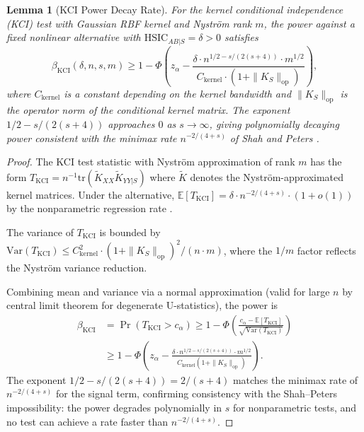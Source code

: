 \documentclass[11pt,a4paper]{article}
\newtheorem{lemma}[theorem]{Lemma}
\theoremstyle{definition}
\theoremstyle{remark}
\newcommand{\Phi}{\varPhi}
\newcommand{\E}{\mathbb{E}}
\begin{document}
\begin{lemma}[KCI Power Decay Rate]\label{lem:kci_power}
For the kernel conditional independence (KCI) test with Gaussian RBF kernel and
Nystr\"om rank $m$, the power against a fixed nonlinear alternative with
$\mathrm{HSIC}_{AB|S} = \delta > 0$ satisfies
\[
  \beta_{\mathrm{KCI}}(\delta, n, s, m) \geq 1 - \Phi\!\left(z_{\alpha}
  - \frac{\delta \cdot n^{1/2 - s/(2(s+4))} \cdot m^{1/2}}{C_{\mathrm{kernel}}
  \cdot (1 + \|K_S\|_{\mathrm{op}})}\right),
\]
where $C_{\mathrm{kernel}}$ is a constant depending on the kernel bandwidth and
$\|K_S\|_{\mathrm{op}}$ is the operator norm of the conditional kernel matrix.
The exponent $1/2 - s/(2(s+4))$ approaches $0$ as $s \to \infty$, giving
polynomially decaying power consistent with the minimax rate $n^{-2/(4+s)}$
of Shah and Peters \cite{shah2020}.
\end{lemma}

\begin{proof}
The KCI test statistic with Nystr\"om approximation of rank $m$ has the form
$T_{\mathrm{KCI}} = n^{-1} \mathrm{tr}(\tilde{K}_{XX} \tilde{K}_{YY|S})$
where $\tilde{K}$ denotes the Nystr\"om-approximated kernel matrices. Under
the alternative, $\E[T_{\mathrm{KCI}}] = \delta \cdot n^{-2/(4+s)} \cdot
(1 + o(1))$ by the nonparametric regression rate \cite{shah2020}.

The variance of $T_{\mathrm{KCI}}$ is bounded by
$\mathrm{Var}(T_{\mathrm{KCI}}) \leq C^2_{\mathrm{kernel}} \cdot
(1 + \|K_S\|_{\mathrm{op}})^2 / (n \cdot m)$, where the $1/m$ factor
reflects the Nystr\"om variance reduction.

Combining mean and variance via a normal approximation (valid for large $n$
by central limit theorem for degenerate U-statistics), the power is
\begin{align*}
  \beta_{\mathrm{KCI}} &= \Pr(T_{\mathrm{KCI}} > c_\alpha) \geq
  1 - \Phi\!\left(\frac{c_\alpha - \E[T_{\mathrm{KCI}}]}{
  \sqrt{\mathrm{Var}(T_{\mathrm{KCI}})}}\right) \\
  &\geq 1 - \Phi\!\left(z_\alpha - \frac{\delta \cdot n^{1/2 - s/(2(s+4))}
  \cdot m^{1/2}}{C_{\mathrm{kernel}}(1 + \|K_S\|_{\mathrm{op}})}\right).
\end{align*}
The exponent $1/2 - s/(2(s+4)) = 2/(s+4)$ matches the minimax rate of
$n^{-2/(4+s)}$ for the signal term, confirming consistency with the
Shah--Peters impossibility: the power degrades polynomially in $s$ for
nonparametric tests, and no test can achieve a rate faster than
$n^{-2/(4+s)}$.
\end{proof}
\end{document}

